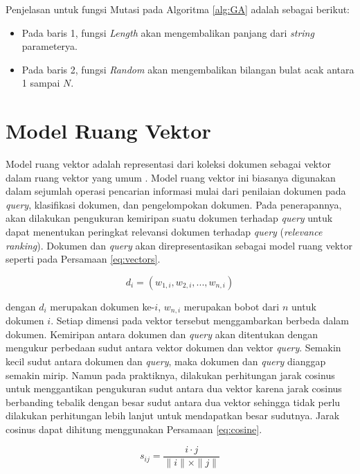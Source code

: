 Penjelasan untuk fungsi Mutasi pada Algoritma \ref{alg:GA} adalah sebagai berikut:
\begin{itemize}
	\item Pada baris 1, fungsi \textit{Length} akan mengembalikan panjang dari \textit{string} parameterya.
	\item Pada baris 2, fungsi \textit{Random} akan mengembalikan bilangan bulat acak antara 1 sampai $N$.
\end{itemize}

\pagebreak
\section{Model Ruang Vektor}
\label{sec:vsm}
Model ruang vektor adalah representasi dari koleksi dokumen sebagai vektor dalam ruang vektor yang umum \cite{schutze2008introduction}. Model ruang vektor ini biasanya digunakan dalam sejumlah operasi pencarian informasi mulai dari penilaian dokumen pada \textit{query}, klasifikasi dokumen, dan pengelompokan dokumen. Pada penerapannya, akan dilakukan pengukuran kemiripan suatu dokumen terhadap \textit{query} untuk dapat menentukan peringkat relevansi dokumen terhadap \textit{query} (\textit{relevance ranking}). Dokumen dan \textit{query} akan direpresentasikan sebagai model ruang vektor seperti pada Persamaan \ref{eq:vectors}.

\begin{equation}
\label{eq:vectors}
	d_i = (w_{1,i}, w_{2,i}, ..., w_{n,i})
\end{equation}

dengan $d_i$ merupakan dokumen ke-$i$, $w_{n,i}$ merupakan bobot dari \term $n$ untuk dokumen $i$. Setiap dimensi pada vektor tersebut menggambarkan \term berbeda dalam dokumen. Kemiripan antara dokumen dan \textit{query} akan ditentukan dengan mengukur perbedaan sudut antara vektor dokumen dan vektor \textit{query}. Semakin kecil sudut antara dokumen dan \textit{query}, maka dokumen dan \textit{query} dianggap semakin mirip. Namun pada praktiknya, dilakukan perhitungan jarak cosinus untuk menggantikan pengukuran sudut antara dua vektor karena jarak cosinus berbanding tebalik dengan besar sudut antara dua vektor sehingga tidak perlu dilakukan perhitungan lebih lanjut untuk mendapatkan besar sudutnya. Jarak cosinus dapat dihitung menggunakan Persamaan \ref{eq:cosine}.

\begin{equation}
\label{eq:cosine}
s_{ij}=\frac{i\cdot j}{\parallel i \parallel \times \parallel j \parallel}
\end{equation}

